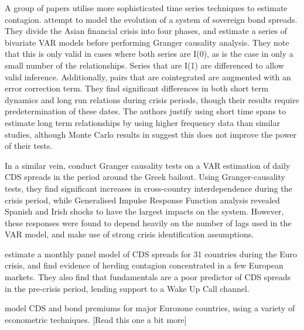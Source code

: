 \documentclass[../base.tex]{subfiles}
\begin{document}
A group of papers utilise more sophisticated time series techniques to estimate contagion. \cite{sander2003contagion} attempt to model the evolution of a system of sovereign bond spreads. They divide the Asian financial crisis into four phases, and estimate a series of bivariate VAR models before performing Granger causality analysis. They note that this is only valid in cases where both series are I(0), as is the case in only a small number of the relationships. Series that are I(1) are differenced to allow valid inference. Additionally, pairs that are cointegrated are augmented with an error correction term. They find significant differences in both short term dynamics and long run relations during crisis periods, though their results require predetermination of these dates. The authors justify using short time spans to estimate long term relationships by using higher frequency data than similar studies, although Monte Carlo results in \cite{pierse1995temporal} suggest this does not improve the power of their tests.

In a similar vein,  \cite{kalbaska2012eurozone} conduct Granger causality tests on a VAR estimation of daily CDS spreads in the period around the Greek bailout. Using Granger-causality tests, they find significant increases in cross-country interdependence during the crisis period, while Generalised Impulse Response Function analysis revealed Spanish and Irish shocks to have the largest impacts on the system. However, these responses were found to depend heavily on the number of lags used in the VAR model, and make use of strong crisis identification assumptions.

\cite{beirne2013pricing} estimate a monthly panel model of CDS spreads for 31 countries during the Euro crisis, and find evidence of herding contagion concentrated in a few European markets. They also find that fundamentals are a poor predictor of CDS spreads in the pre-crisis period, lending support to a Wake Up Call channel.

\cite{caporin2013measuring} model CDS and bond premiums for major Eurozone countries, using a variety of econometric techniques. [Read this one a bit more]
\end{document}
